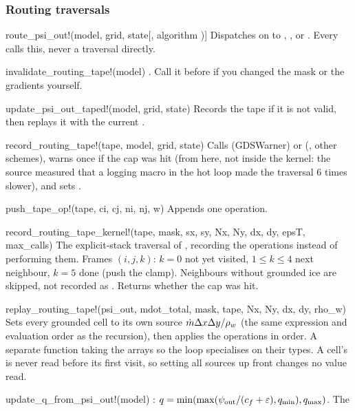 \subsubsection*{Routing traversals}
\begin{fnlist}
\item[route\_psi\_out!(model, grid, state[, algorithm])] Dispatches on  to ,
  ,  or . Every  calls
  this, never a traversal directly.
\item[invalidate\_routing\_tape!(model)] . Call it before  if you changed the mask or
  the gradients yourself.
\item[update\_psi\_out\_taped!(model, grid, state)] Records the tape if it is not valid, then replays it with the current
  .
\item[record\_routing\_tape!(tape, model, grid, state)] Calls  (GDSWarner) or
   (, other schemes), warns once if the cap was hit (from here, not inside
  the kernel: the source measured that a logging macro in the hot loop made the traversal 6 times slower), and sets
  .
\item[push\_tape\_op!(tape, ci, cj, ni, nj, w)] Appends one operation.
\item[record\_routing\_tape\_kernel!(tape, mask, sx, sy, Nx, Ny, dx, dy, epsT, max\_calls)] The explicit-stack traversal of
  , recording the operations instead of performing them. Frames $(i,j,k)$: $k = 0$ not yet visited,
  $1\le k\le4$ next neighbour, $k = 5$ done (push the clamp). Neighbours without grounded ice are skipped, not recorded as
  . Returns whether the cap was hit.
\item[replay\_routing\_tape!(psi\_out, mdot\_total, mask, tape, Nx, Ny, dx, dy, rho\_w)] Sets every grounded cell to its own source
  $\dot m\Delta x\Delta y/{\rho_w}$ (the same expression and evaluation order as the recursion), then applies the operations in order. A separate
  function taking the arrays so the loop specialises on their types. A cell's  is never read before its first visit, so
  setting all sources up front changes no value read.
\item[update\_q\_from\_psi\_out!(model)] : $q = \min(\max({\psi_{\rm out}}/(c_f+\varepsilon), q_{\min}), q_{\max})$. The

\end{fnlist}
